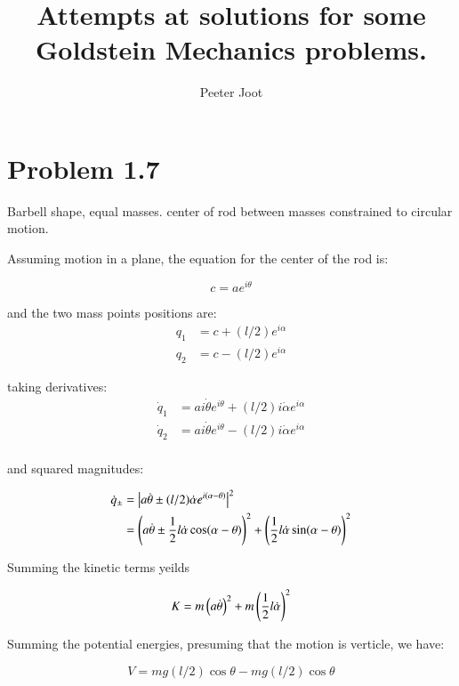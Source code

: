 \documentclass{article}      %
\title{Attempts at solutions for some Goldstein Mechanics problems.} %
\author{Peeter Joot}         %
\date{ }        %
\newcommand{\Abs}[1]{\left\lvert{#1}\right\rvert}
\newcommand{\qdot}[0]{\dot{q}}
\newcommand{\dotalpha}[0]{\dot{\alpha}}
\newcommand{\dottheta}[0]{\dot{\theta}}
\begin{document}

\maketitle{}

\section{ Problem 1.7 }

Barbell shape, equal masses.  center of rod between masses constrained to circular motion.

Assuming motion in a plane, the equation for the center of the rod is:

\begin{equation*}
c = a e^{i\theta}
\end{equation*}

and the two mass points positions are:
\begin{align*}
q_1 &= c + (l/2) e^{i\alpha} \\
q_2 &= c - (l/2) e^{i\alpha}
\end{align*}

taking derivatives:
\begin{align*}
\qdot_1 &= a i \dottheta e^{i\theta} + (l/2) i \dotalpha e^{i\alpha} \\
\qdot_2 &= a i \dottheta e^{i\theta} - (l/2) i \dotalpha e^{i\alpha} \\
\end{align*}

and squared magnitudes:

\begin{align*}
\qdot_{\pm}
&= \Abs{a \dottheta \pm (l/2) \dotalpha e^{i(\alpha - \theta)}}^2 \\
&= \left(a \dottheta   \pm   \inv{2} l \dotalpha \cos(\alpha - \theta)\right)^2 + \left(\inv{2} l \dotalpha \sin(\alpha - \theta)\right)^2
\end{align*}

Summing the kinetic terms yeilds

\begin{equation*}
K = m \left(a \dottheta \right)^2 + m \left(\inv{2} l \dotalpha\right)^2
\end{equation*}

Summing the potential energies, presuming that the motion is verticle, we have:

\begin{equation*}
V = m g (l/2) \cos\theta - m g (l/2) \cos \theta
\end{equation*}
\end{document}
